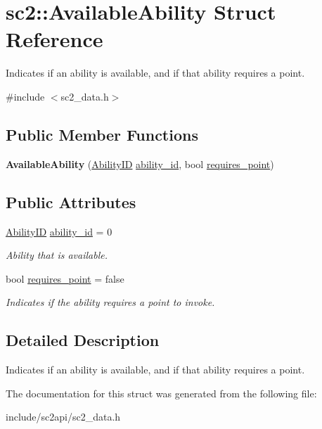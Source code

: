 \hypertarget{structsc2_1_1_available_ability}{}\section{sc2\+:\+:Available\+Ability Struct Reference}
\label{structsc2_1_1_available_ability}


Indicates if an ability is available, and if that ability requires a point.  




{\ttfamily \#include $<$sc2\+\_\+data.\+h$>$}

\subsection*{Public Member Functions}
\begin{DoxyCompactItemize}
\item 
\mbox{\label{structsc2_1_1_available_ability_af99b42b20bdaf45e9f3d4745eb222289}} 
{\bfseries Available\+Ability} (\hyperlink{classsc2_1_1_s_c2_type}{Ability\+ID} \hyperlink{structsc2_1_1_available_ability_ace0e29a4331fdf570146b3768203f294}{ability\+\_\+id}, bool \hyperlink{structsc2_1_1_available_ability_ac8ec9ad102f838de53565b75c4b67e99}{requires\+\_\+point})
\end{DoxyCompactItemize}
\subsection*{Public Attributes}
\begin{DoxyCompactItemize}
\item 
\mbox{\label{structsc2_1_1_available_ability_ace0e29a4331fdf570146b3768203f294}} 
\hyperlink{classsc2_1_1_s_c2_type}{Ability\+ID} \hyperlink{structsc2_1_1_available_ability_ace0e29a4331fdf570146b3768203f294}{ability\+\_\+id} = 0
\begin{DoxyCompactList}\small\item\em Ability that is available. \end{DoxyCompactList}\item 
\mbox{\label{structsc2_1_1_available_ability_ac8ec9ad102f838de53565b75c4b67e99}} 
bool \hyperlink{structsc2_1_1_available_ability_ac8ec9ad102f838de53565b75c4b67e99}{requires\+\_\+point} = false
\begin{DoxyCompactList}\small\item\em Indicates if the ability requires a point to invoke. \end{DoxyCompactList}\end{DoxyCompactItemize}


\subsection{Detailed Description}
Indicates if an ability is available, and if that ability requires a point. 

The documentation for this struct was generated from the following file\+:\begin{DoxyCompactItemize}
\item 
include/sc2api/sc2\+\_\+data.\+h\end{DoxyCompactItemize}
